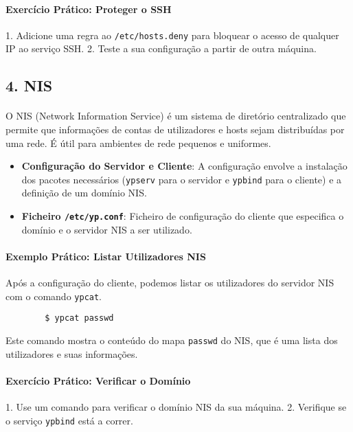 \documentclass[10pt,a4paper]{article}
\begin{document}
	\paragraph{\bfseries Exercício Prático: Proteger o SSH}
	1. Adicione uma regra ao \texttt{/etc/hosts.deny} para bloquear o acesso de qualquer IP ao serviço SSH.
	2. Teste a sua configuração a partir de outra máquina.
	
	\subsection*{4. NIS}
	\vspace{-1.2em}
	\paragraph{}
	O NIS (Network Information Service) é um sistema de diretório centralizado que permite que informações de contas de utilizadores e hosts sejam distribuídas por uma rede. É útil para ambientes de rede pequenos e uniformes.
	
	\begin{itemize}
		\item \textbf{Configuração do Servidor e Cliente}: A configuração envolve a instalação dos pacotes necessários (\texttt{ypserv} para o servidor e \texttt{ypbind} para o cliente) e a definição de um domínio NIS.
		\item \textbf{Ficheiro \texttt{/etc/yp.conf}}: Ficheiro de configuração do cliente que especifica o domínio e o servidor NIS a ser utilizado.
	\end{itemize}
	
	\paragraph{\bfseries Exemplo Prático: Listar Utilizadores NIS}
	Após a configuração do cliente, podemos listar os utilizadores do servidor NIS com o comando \texttt{ypcat}.
	
	\begin{verbatim}
		$ ypcat passwd
	\end{verbatim}
	
	Este comando mostra o conteúdo do mapa \texttt{passwd} do NIS, que é uma lista dos utilizadores e suas informações.
	
	\paragraph{\bfseries Exercício Prático: Verificar o Domínio}
	1. Use um comando para verificar o domínio NIS da sua máquina.
	2. Verifique se o serviço \texttt{ypbind} está a correr.
	
\end{document}
